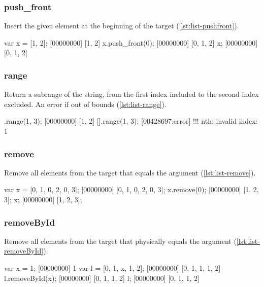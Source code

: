 \subsubsection{push\_front}

Insert the given element at the beginning of the target
(\autoref{lst:list-pushfront}).

\begin{urbiscript}[caption=List.push\_front, label=lst:list-pushfront, float=\floatposh]
  var x = [1, 2];
  [00000000] [1, 2]
  x.push_front(0);
  [00000000] [0, 1, 2]
  x;
  [00000000] [0, 1, 2]
\end{urbiscript}

\subsubsection{range}

Return a subrange of the string, from the first index included to the
second index excluded. An error if out of bounds (\autoref{lst:list-range}).

\begin{urbiscript}[caption=List.range, label=lst:list-range, float=\floatposh]
  [0, 1, 2, 3].range(1, 3);
  [00000000] [1, 2]
  [].range(1, 3);
  [00428697:error] !!! nth: invalid index: 1
\end{urbiscript}


\subsubsection{remove}

Remove all elements from the target that equals the argument
(\autoref{lst:list-remove}).

\begin{urbiscript}[caption=List.remove, label=lst:list-remove, float=\floatposh]
  var x = [0, 1, 0, 2, 0, 3];
  [00000000] [0, 1, 0, 2, 0, 3];
  x.remove(0);
  [00000000] [1, 2, 3];
  x;
  [00000000] [1, 2, 3];
\end{urbiscript}

\subsubsection{removeById}

Remove all elements from the target that physically equals the
argument (\autoref{lst:list-removeById}).

\begin{urbiscript}[caption=List.removeById, label=lst:list-removeById,
  float=\floatposh]
  var x = 1;
  [00000000] 1
  var l = [0, 1, x, 1, 2];
  [00000000] [0, 1, 1, 1, 2]
  l.removeById(x);
  [00000000] [0, 1, 1, 2]
  l;
  [00000000] [0, 1, 1, 2]
\end{urbiscript}

